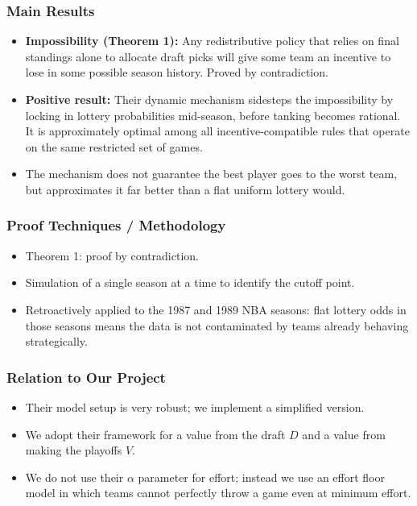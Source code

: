 \documentclass{article}
\begin{document}
\subsubsection*{Main Results}
\begin{itemize}
    \item \textbf{Impossibility (Theorem 1):} Any redistributive policy that
    relies on final standings alone to allocate draft picks will give some team
    an incentive to lose in some possible season history. Proved by
    contradiction.
    \item \textbf{Positive result:} Their dynamic mechanism sidesteps the
    impossibility by locking in lottery probabilities mid-season, before
    tanking becomes rational. It is approximately optimal among all
    incentive-compatible rules that operate on the same restricted set of games.
    \item The mechanism does not guarantee the best player goes to the worst
    team, but approximates it far better than a flat uniform lottery would.
\end{itemize}

\subsubsection*{Proof Techniques / Methodology}
\begin{itemize}
    \item Theorem 1: proof by contradiction.
    \item Simulation of a single season at a time to identify the cutoff point.
    \item Retroactively applied to the 1987 and 1989 NBA seasons: flat lottery
    odds in those seasons means the data is not contaminated by teams already
    behaving strategically.
\end{itemize}

\subsubsection*{Relation to Our Project}
\begin{itemize}
    \item Their model setup is very robust; we implement a simplified version.
    \item We adopt their framework for a value from the draft $D$ and a value
    from making the playoffs $V$.
    \item We do not use their $\alpha$ parameter for effort; instead we use an
    effort floor model in which teams cannot perfectly throw a game even at
    minimum effort.
\end{itemize}
\end{document}
